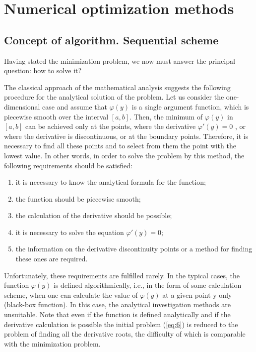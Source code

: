 \section{Numerical optimization methods}
\label{sec:1.2}

\subsection {Concept of algorithm. Sequential scheme}
\label {subsec:1.2.1}

Having stated the minimization problem, we now must answer the principal question: how to solve it?

The classical approach of the mathematical analysis suggests the following procedure for the analytical solution of the problem. Let us consider the one-dimensional case and assume that $\varphi(y)$ is a single argument function, which is piecewise smooth over the interval $[a,b]$. Then, the minimum of $\varphi(y)$ in $[a,b]$ can be achieved only at the points, where the derivative $\varphi'(y)=0$ , or where the derivative is discontinuous, or at the boundary points. Therefore, it is necessary to find all these points and to select from them the point with the lowest value. In other words, in order to solve the problem by this method, the following requirements should be satisfied:
\begin{enumerate}
\item{it is necessary to know the analytical formula for the function;}
\item{the function should be piecewise smooth;}
\item{the calculation of the derivative should be possible;}
\item{it is necessary to solve the equation $\varphi'(y)=0$;}
\item{the information on the derivative discontinuity points or a method for finding these ones are required.}
\end{enumerate}

Unfortunately, these requirements are fulfilled rarely. In the typical cases, the function $\varphi(y)$ is defined algorithmically, i.e., in the form of some calculation scheme, when one can calculate the value of $\varphi(y)$ at a given point y only (black-box function). In this case, the analytical investigation methods are unsuitable. Note that even if the function is defined analytically and if the derivative calculation is possible the initial problem (\ref{eq:6}) is reduced to the problem of finding all the derivative roots, the difficulty of which is comparable with the minimization problem.

